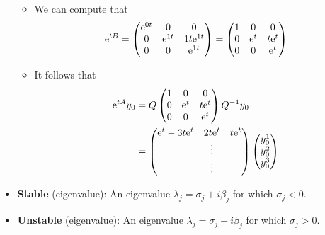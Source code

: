 \documentclass[../notes.tex]{subfiles}
\begin{document}
\begin{itemize}
\begin{itemize}
\begin{itemize}
        \end{itemize}
        \item We can compute that
        \begin{equation*}
            \e[tB] =
            \begin{pmatrix}
                \e[0t] & 0 & 0\\
                0 & \e[1t] & 1t\e[1t]\\
                0 & 0 & \e[1t]\\
            \end{pmatrix}
            =
            \begin{pmatrix}
                1 & 0 & 0\\
                0 & \e[t] & t\e[t]\\
                0 & 0 & \e[t]\\
            \end{pmatrix}
        \end{equation*}
        \item It follows that
        \begin{align*}
            \e[tA]y_0 &= Q
            \begin{pmatrix}
                1 & 0 & 0\\
                0 & \e[t] & t\e[t]\\
                0 & 0 & \e[t]\\
            \end{pmatrix}
            Q^{-1}y_0\\
            &=
            \begin{pmatrix}
                \e[t]-3t\e[t] & 2t\e[t] & t\e[t]\\
                 & \vdots & \\
                 & \vdots & \\
            \end{pmatrix}
            \begin{pmatrix}
                y_0^1\\
                y_0^2\\
                y_0^3\\
            \end{pmatrix}
        \end{align*}
    \end{itemize}
    \item \textbf{Stable} (eigenvalue): An eigenvalue $\lambda_j=\sigma_j+i\beta_j$ for which $\sigma_j<0$.
    \item \textbf{Unstable} (eigenvalue): An eigenvalue $\lambda_j=\sigma_j+i\beta_j$ for which $\sigma_j>0$.

\end{itemize}
\end{document}
